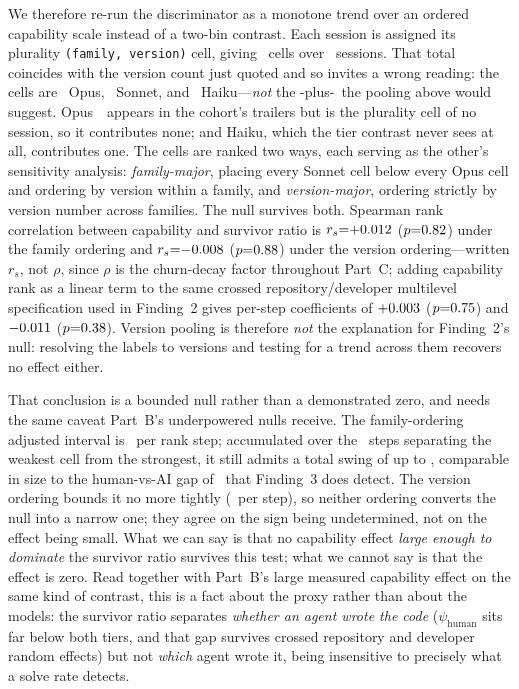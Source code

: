 We therefore re-run the discriminator as a monotone trend over an ordered capability scale instead of a two-bin contrast. Each session is assigned its plurality \texttt{(family, version)} cell, giving \statPCCapCells\ cells over \statPCCapSessions\ sessions. That total coincides with the version count just quoted and so invites a wrong reading: the cells are \statPCCapCellsOpus\ Opus, \statPCCapCellsSonnet\ Sonnet, and \statPCCapCellsHaiku\ Haiku---\emph{not} the \statPCOpusVersions-plus-\statPCSonnetVersions\ the pooling above would suggest. Opus~\statPCCapAbsentOpusVersion\ appears in the cohort's trailers but is the plurality cell of no session, so it contributes none; and Haiku, which the tier contrast never sees at all, contributes one. The cells are ranked two ways, each serving as the other's sensitivity analysis: \emph{family-major}, placing every Sonnet cell below every Opus cell and ordering by version within a family, and \emph{version-major}, ordering strictly by version number across families. The null survives both. Spearman rank correlation between capability and survivor ratio is $r_s{=}{+}0.012$ ($p{=}0.82$) under the family ordering and $r_s{=}{-}0.008$ ($p{=}0.88$) under the version ordering---written $r_s$, not $\rho$, since $\rho$ is the churn-decay factor throughout Part~C; adding capability rank as a linear term to the same crossed repository/developer multilevel specification used in Finding~2 gives per-step coefficients of ${+}0.003$ ($p{=}0.75$) and ${-}0.011$ ($p{=}0.38$). Version pooling is therefore \emph{not} the explanation for Finding~2's null: resolving the labels to versions and testing for a trend across them recovers no effect either.

That conclusion is a bounded null rather than a demonstrated zero, and needs the same caveat Part~B's underpowered nulls receive. The family-ordering adjusted interval is \statPCCapFamilyCI\ per rank step; accumulated over the \statPCCapSteps\ steps separating the weakest cell from the strongest, it still admits a total swing of up to \statPCCapSwing, comparable in size to the human-vs-AI gap of \statPCCtrlGapOpus\ that Finding~3 does detect. The version ordering bounds it no more tightly (\statPCCapVersionCI\ per step), so neither ordering converts the null into a narrow one; they agree on the sign being undetermined, not on the effect being small. What we can say is that no capability effect \emph{large enough to dominate} the survivor ratio survives this test; what we cannot say is that the effect is zero. Read together with Part~B's large measured capability effect on the same kind of contrast, this is a fact about the proxy rather than about the models: the survivor ratio separates \emph{whether an agent wrote the code} ($\psi_{\mathrm{human}}$ sits far below both tiers, and that gap survives crossed repository and developer random effects) but not \emph{which} agent wrote it, being insensitive to precisely what a solve rate detects.

